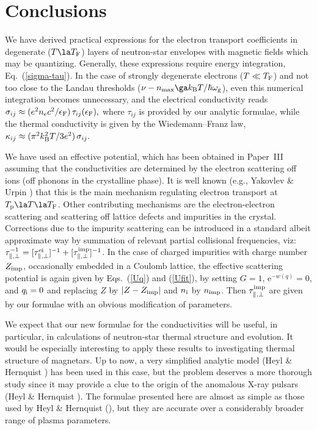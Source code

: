 \documentclass{aa}
\newcommand{\req}[1]{Eq.~(\ref{#1})}
\newcommand{\kB}{k_{\rm B}}
\newcommand{\omg}{\omega_{\rm g}}
\newcommand{\EF}{\epsilon_{\rm F}}
\begin{document}
{{%
\section{Conclusions}
\label{sect-concl}
We have derived practical expressions for the electron
transport coefficients in degenerate ($T\la T_{\rm F}$) layers
of neutron-star envelopes with magnetic fields which
may be quantizing. Generally, these expressions require
energy integration, \req{sigma-tau}.
In the case of strongly degenerate electrons
($T\ll T_{\rm F}$) and not too close to the Landau thresholds
($\nu-n_{\rm max}\ga \kB T/ \hbar \omg$),
even this numerical integration becomes unnecessary, and
the electrical conductivity reads
$
   \sigma_{ij} \approx (e^2 n_{\rm e} c^2 /\EF)\,\tau_{ij}(\EF),
$
where $\tau_{ij}$ is provided by our analytic formulae,
while the thermal conductivity is given by the Wiedemann--Franz
law,
$
   \kappa_{ij} \approx (\pi^2\kB^2 T / 3e^2)\,\sigma_{ij}.
$

We have used an effective potential, which 
has been obtained in Paper~III
assuming that the conductivities are determined by
the electron scattering off ions (off phonons in the crystalline phase).
It is well known
(e.g., Yakovlev \& Urpin \cite{yu80}) that
this is the main mechanism regulating electron transport
at $T_{\rm p} \la T \la T_{\rm F}$.
Other contributing mechanisms
are the electron-electron scattering
and scattering off lattice defects and impurities in the crystal.
Corrections due to the impurity scattering can be introduced
in a standard albeit approximate way by summation of relevant
partial collisional frequencies, viz:
$\tau_{\|,\perp}^{-1}=
[\tau_{\|,\perp}^{\rm ei}]^{-1}+[\tau_{\|,\perp}^{\rm imp}]^{-1}$.
In the case of charged impurities
with charge number $Z_{\rm imp}$,
occasionally embedded in a Coulomb lattice,
the effective scattering potential is again given by
Eqs.~(\ref{Uq}) and (\ref{Ufit}),
by setting $G=1$, $\mathrm{e}^{-w(q)}=0$, and $q_{\rm i}=0$
and replacing $Z$ by $|Z-Z_{\rm imp}|$ and $n_{\rm i}$ by $n_{\rm imp}$.
Then
$\tau_{\|,\perp}^{\rm imp}$ are given by our formulae
with an obvious modification of parameters.

We expect that our new formulae for the conductivities
will be useful, in particular, in calculations
of neutron-star thermal structure and evolution.
It would be especially interesting
to apply these results to investigating thermal
structure of magnetars. Up to now,
a very simplified analytic model
(Heyl \& Hernquist \cite{hh-theory}) has been used in this case,
but the problem deserves a more thorough study
since it may provide a clue to the origin of
the anomalous X-ray pulsars (Heyl \& Hernquist \cite{hh97b}).
The formulae presented here are almost as simple as
those used by Heyl \& Hernquist (\cite{hh-theory}), but they are accurate
over a considerably broader range of plasma parameters.

}}
\end{document}
